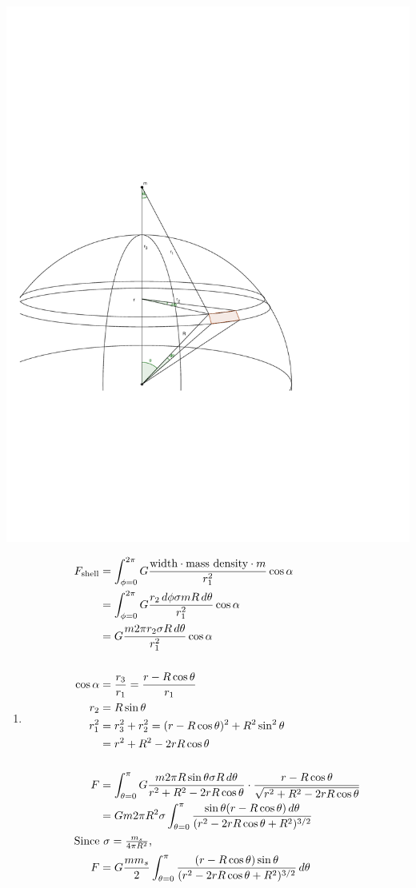 \documentclass{esg8012pset}
\renewcommand{\d}{\,d}
\begin{document}
\begin{solution}
  \begin{center}\includegraphics[width=.5\textwidth]{2009-10-02_Diagram_2_1}\end{center}
  \begin{enumerate}[1)]
    \item \begin{align*}
     F_{\text{shell}} & = \int_{\phi=0}^{2\pi}G \frac{\text{width}\cdot \text{mass density}\cdot m}{r_1^2}\cos\alpha \\
      & = \int_{\phi=0}^{2\pi}G \frac{r_2\d{\phi}\sigma m R\d{\theta}}{r_1^2}\cos\alpha \\
      & = G \frac{m 2\pi r_2 \sigma  R\d{\theta}}{r_1^2}\cos\alpha \\
      \\
    \cos\alpha & = \frac{r_3}{r_1} = \frac{r - R\cos\theta}{r_1} \\
    r_2 & = R\sin\theta \\
    r_1^2 & = r_3^2 + r_2^2  = (r-R\cos\theta)^2+R^2\sin^2\theta \\
     & = r^2 + R^2 - 2rR\cos\theta \\
    \\
    F & = \int_{\theta = 0}^{\pi} G \frac{m 2\pi R\sin\theta \sigma  R\d{\theta}}{r^2 + R^2 - 2rR\cos\theta}\cdot \frac{r - R\cos\theta}{\sqrt{r^2 + R^2 - 2rR\cos\theta}} \\
     & = G m 2\pi R^2 \sigma \int_{\theta = 0}^{\pi} \frac{\sin\theta(r-R\cos\theta) \d{\theta}}{(r^2 - 2rR\cos\theta + R^2)^{3/2}} \\
    \intertext{Since $\sigma = \frac{m_s}{4\pi R^2}$,}
    F & = G \frac{m m_s}{2} \int_{\theta = 0}^{\pi} \frac{(r-R\cos\theta)\sin\theta}{(r^2 - 2rR\cos\theta + R^2)^{3/2}} \d{\theta} \\

\end{align*}
\end{enumerate}
\end{solution}
\end{document}

